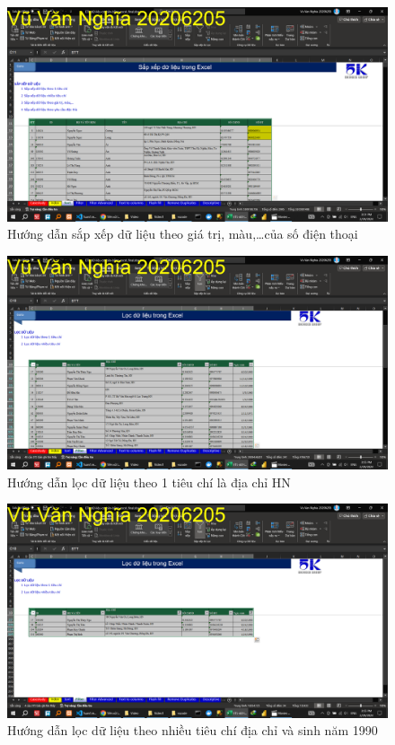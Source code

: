 \documentclass{article}
\begin{document}
\begin{figure}[h]
    \centering
    \includegraphics[scale = 0.15]{Video1/HuongDan/3.png}
    \caption{Hướng dẫn sắp xếp dữ liệu theo giá trị, màu,\dots của số điện thoại}
\end{figure}

\begin{figure}[h]
    \centering
    \includegraphics[scale = 0.15]{Video1/HuongDan/4.png}
    \caption{Hướng dẫn lọc dữ liệu theo 1 tiêu chí là địa chỉ HN}
\end{figure}
\begin{figure}[h]
    \centering
    \includegraphics[scale = 0.15]{Video1/HuongDan/5.png}
    \caption{Hướng dẫn lọc dữ liệu theo nhiều tiêu chí địa chỉ và sinh năm 1990}
\end{figure}
\end{document}
